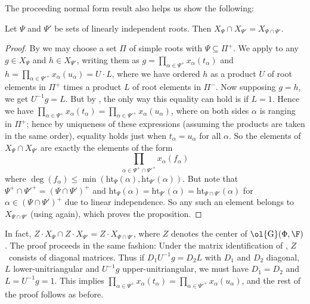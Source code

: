 \documentclass[11pt]{article}
\newcommand{\Esc}[2]{\ol{\mathrm{G}}(#1,#2)}
\newcommand{\hgt}{{\mathrm{ht}}}
\begin{document}
The proceeding normal form result also helps us show the following:
\begin{proposition}\label{subint}
Let $\Psi$ and $\Psi'$ be sets of linearly independent roots. Then $X_\Psi \cap X_{\Psi'} = X_{\Psi \cap \Psi'}$.
\end{proposition}
\begin{proof}
    By  we may choose a set $\Pi$ of simple roots with $\Psi \subseteq \Pi^+$. We apply  to any $g \in X_\Psi$ and $h \in X_{\Psi'}$, writing them as $g = \prod_{\alpha \in \Psi^+} x_\alpha(t_\alpha)$ and $h = \prod_{\alpha \in \Psi'^+} x_\alpha(u_\alpha)  = U \cdot L$, where we have ordered $h$ as a product $U$ of root elements in $\Pi^+$ times a product $L$ of root elements in $\Pi^-$. Now supposing $g=h$, we get $U^{-1}g=L$. But by , the only way this equality can hold is if $L = 1$. Hence we have $\prod_{\alpha \in \Psi^+} x_\alpha(t_\alpha) = \prod_{\alpha \in \Psi'^+} x_\alpha(u_\alpha)$, where on both sides $\alpha$ is ranging in $\Pi^+$; hence by uniqueness of these expressions (assuming the products are taken in the same order), equality holds just when $t_\alpha = u_\alpha$ for all $\alpha$. So the elements of $X_{\Psi} \cap X_{\Psi'}$ are exactly the elements of the form
\[\prod_{\alpha \in \Psi^+ \cap \Psi'^+} x_\alpha(f_\alpha) \]
    where $\deg(f_\alpha) \le \min(\hgt_{\Psi}(\alpha),\hgt_{\Psi'}(\alpha))$. But note that $\Psi^+ \cap \Psi'^+=(\Psi \cap \Psi')^+$ and $\hgt_\Psi(\alpha) = \hgt_{\Psi'}(\alpha)=\hgt_{\Psi \cap \Psi'}(\alpha)$ for $\alpha \in (\Psi \cap \Psi')^+$ due to linear independence. So any such an element belongs to $X_{\Psi \cap \Psi'}$ (using  again), which proves the proposition.
\end{proof}
\begin{observation}\label{obs:centerint}
In fact, $Z \cdot X_{\Psi} \cap Z \cdot X_{\Psi'} = Z \cdot X_{\Psi \cap \Psi'}$, where $Z$ denotes the center of $\Esc{\Phi}{\F}$. The proof proceeds in the same fashion: Under the matrix identification of , $Z$~consists of diagonal matrices. Thus if $D_1 U^{-1}g = D_2 L$ with $D_1$ and $D_2$ diagonal, $L$ lower-unitriangular and $U^{-1}g$ upper-unitriangular, we must have $D_1=D_2$ and $L=U^{-1}g=1$. This implies $\prod_{\alpha \in \Psi^+} x_\alpha(t_\alpha) = \prod_{\alpha \in \Psi'^+} x_\alpha(u_\alpha)$, and the rest of the proof follows as before.
\end{observation}
\end{document}
